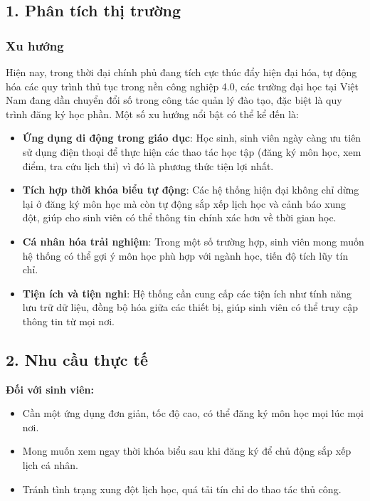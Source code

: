\documentclass[../main.tex]{subfiles}
\begin{document}
\subsection*{1. Phân tích thị trường}

\subsubsection*{Xu hướng}
Hiện nay, trong thời đại chính phủ đang tích cực thúc đẩy hiện đại hóa, tự động hóa các quy trình thủ tục trong nền công nghiệp 4.0, các trường đại học tại Việt Nam đang dần chuyển đổi số trong công tác quản lý đào tạo, đặc biệt là quy trình đăng ký học phần. Một số xu hướng nổi bật có thể kể đến là:

\begin{itemize}
    \item \textbf{Ứng dụng di động trong giáo dục}: Học sinh, sinh viên ngày càng ưu tiên sử dụng điện thoại để thực hiện các thao tác học tập (đăng ký môn học, xem điểm, tra cứu lịch thi) vì đó là phương thức tiện lợi nhất.
    \item \textbf{Tích hợp thời khóa biểu tự động}: Các hệ thống hiện đại không chỉ dừng lại ở đăng ký môn học mà còn tự động sắp xếp lịch học và cảnh báo xung đột, giúp cho sinh viên có thể thông tin chính xác hơn về thời gian học.
    \item \textbf{Cá nhân hóa trải nghiệm}: Trong một số trường hợp, sinh viên mong muốn hệ thống có thể gợi ý môn học phù hợp với ngành học, tiến độ tích lũy tín chỉ.
    \item \textbf{Tiện ích và tiện nghi}: Hệ thống cần cung cấp các tiện ích như tính năng lưu trữ dữ liệu, đồng bộ hóa giữa các thiết bị, giúp sinh viên có thể truy cập thông tin từ mọi nơi.
\end{itemize}

\subsection*{2. Nhu cầu thực tế}

\textbf{Đối với sinh viên:}
\begin{itemize}
    \item Cần một ứng dụng đơn giản, tốc độ cao, có thể đăng ký môn học mọi lúc mọi nơi.
    \item Mong muốn xem ngay thời khóa biểu sau khi đăng ký để chủ động sắp xếp lịch cá nhân.
    \item Tránh tình trạng xung đột lịch học, quá tải tín chỉ do thao tác thủ công.
\end{itemize}
\end{document}
